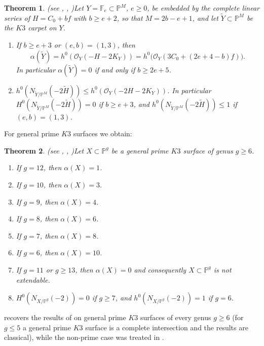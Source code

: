 \documentclass[11pt,twoside]{amsart}
\theoremstyle{plain}
\newtheorem{theorem}{Theorem}[section]
\theoremstyle{definition}
\begin{document}
\begin{theorem}(see , , )\label{thm:carpet intro}
Let $Y = \mathbb{F}_e \subset \mathbb{P}^M$, $e \geq 0$, be embedded by the complete linear series of $H = C_0+bf$ with $b \geq e+2$, so that $M = 2b-e+1$, and let $\widetilde{Y} \subset \mathbb{P}^M$ be the $K3$ carpet on $Y$.
\begin{enumerate}
    \item If $b \geq e+3$ or $(e,b) = (1,3)$, then
    \[
    \alpha(\widetilde{Y}) = h^0(\mathcal{O}_Y(-H-2K_Y)) = h^0\big(\mathcal{O}_Y(3C_0+(2e+4-b)f)\big).
    \]
    In particular $\alpha(\widetilde{Y}) = 0$ if and only if $b \geq 2e+5$.
    \item $h^0(N_{\widetilde{Y}/\mathbb{P}^M}(-2\widetilde{H})) \leq h^0(\mathcal{O}_Y(-2H-2K_Y))$. In particular $H^0(N_{\widetilde{Y}/\mathbb{P}^M}(-2\widetilde{H})) = 0$ if $b \geq e+3$, and $h^0(N_{\widetilde{Y}/\mathbb{P}^M}(-2\widetilde{H})) \leq 1$ if $(e,b) = (1,3)$.
\end{enumerate}
\end{theorem}

For general prime $K3$ surfaces we obtain:

\begin{theorem}(see , , )\label{thm:K3 intro}
Let $X \subset \mathbb{P}^g$ be a general prime $K3$ surface of genus $g \geq 6$.
\begin{enumerate}
    \item If $g = 12$, then $\alpha(X) = 1$.
    \item If $g = 10$, then $\alpha(X) = 3$.
    \item If $g = 9$, then $\alpha(X) = 4$.
    \item If $g = 8$, then $\alpha(X) = 6$.
    \item If $g = 7$, then $\alpha(X) = 8$.
    \item If $g = 6$, then $\alpha(X) = 10$.
    \item If $g = 11$ or $g \geq 13$, then $\alpha(X) = 0$ and consequently $X \subset \mathbb{P}^g$ is not extendable.
    \item $H^0(N_{X/\mathbb{P}^g}(-2)) = 0$ if $g \geq 7$, and $h^0(N_{X/\mathbb{P}^g}(-2)) = 1$ if $g = 6$.
\end{enumerate}
\end{theorem}

 recovers the results of \cite{CLM93} on general prime $K3$ surfaces of every genus $g \geq 6$ (for $g \leq 5$ a general prime $K3$ surface is a complete intersection and the results are classical), while the non-prime case was treated in \cite{BM25}.
\end{document}
